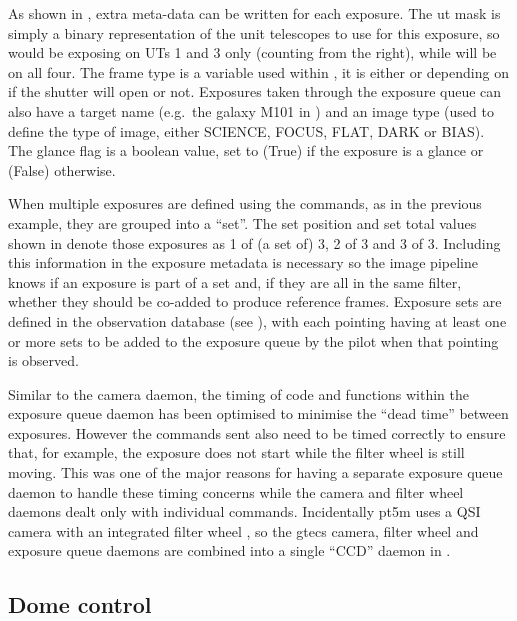 \begin{colsection}
\begin{colsection}
As shown in , extra meta-data can be written for each exposure. The \gls{ut} mask is simply a binary representation of the unit telescopes to use for this exposure, so  would be exposing on UTs 1 and 3 only (counting from the right), while  will be on all four. The frame type is a variable used within , it is either  or  depending on if the shutter will open or not. Exposures taken through the exposure queue can also have a target name (e.g.\ the galaxy M101 in ) and an image type (used to define the type of image, either SCIENCE, FOCUS, FLAT, DARK or BIAS). The glance flag is a boolean value, set to  (True) if the exposure is a glance or  (False) otherwise.

When multiple exposures are defined using the  commands, as in the previous  example, they are grouped into a ``set''. The set position and set total values shown in  denote those exposures as 1 of (a set of) 3, 2 of 3 and 3 of 3. Including this information in the exposure metadata is necessary so the image pipeline knows if an exposure is part of a set and, if they are all in the same filter, whether they should be co-added to produce reference frames. Exposure sets are defined in the observation database (see ), with each pointing having at least one or more sets to be added to the exposure queue by the pilot when that pointing is observed.

Similar to the camera daemon, the timing of code and functions within the exposure queue daemon has been optimised to minimise the ``dead time'' between exposures. However the commands sent also need to be timed correctly to ensure that, for example, the exposure does not start while the filter wheel is still moving. This was one of the major reasons for having a separate exposure queue daemon to handle these timing concerns while the camera and filter wheel daemons dealt only with individual commands. Incidentally \gls{pt5m} uses a QSI camera with an integrated filter wheel \citep{pt5m}, so the \gls{gtecs} camera, filter wheel and exposure queue daemons are combined into a single ``CCD'' daemon in .

\end{colsection}


\subsection{Dome control}
\label{sec:dome}
\begin{colsection}


\end{colsection}
\end{colsection}

